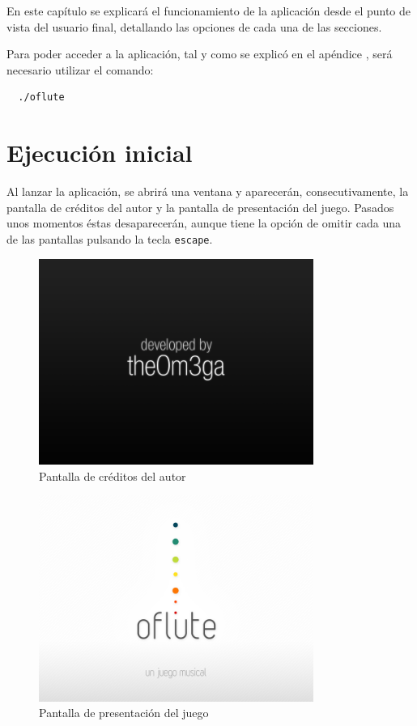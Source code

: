 En este capítulo se explicará el funcionamiento de la aplicación desde el punto
de vista del usuario final, detallando las opciones de cada una de las secciones.

Para poder acceder a la aplicación, tal y como se explicó en el apéndice 
\textit{}, será necesario utilizar el comando:

\begin{verbatim}
  ./oflute
\end{verbatim}

\section{Ejecución inicial}
Al lanzar la aplicación, se abrirá una ventana y aparecerán, consecutivamente,
la pantalla de créditos del autor y la pantalla de presentación del
juego. Pasados unos momentos éstas desaparecerán, aunque tiene la opción de
omitir cada una de las pantallas pulsando la tecla \texttt{escape}.

\begin{figure}[h!]
  \centering
  \includegraphics[width=0.8\textwidth]{apendice_manual_usuario/imagen_estadoAutor}
  \caption{Pantalla de créditos del autor}
  \vspace{-1cm}
\end{figure}

\begin{figure}[h!]
  \centering
  \includegraphics[width=0.8\textwidth]{apendice_manual_usuario/imagen_estadoIntro}
  \caption{Pantalla de presentación del juego}
  \vspace{-0.3cm}
\end{figure}

